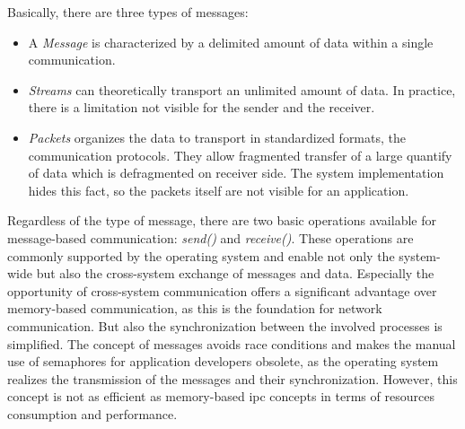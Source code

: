 Basically, there are three types of messages:
\begin{itemize}
    \item A \textit{Message} is characterized by a delimited amount of data within a single communication.
    \item \textit{Streams} can theoretically transport an unlimited amount of data. In practice, there is a limitation not visible for the sender and the receiver.
    \item \textit{Packets} organizes the data to transport in standardized formats, the communication protocols. They allow fragmented transfer of a large quantify of data which is defragmented on receiver side. The system implementation hides this fact, so the packets itself are not visible for an application\cite{glatz2015betriebssysteme}. 
\end{itemize}


Regardless of the type of message, there are two basic operations available for message-based communication: \textit{send()} and \textit{receive()}.
These operations are commonly supported by the operating system and enable not only the system-wide but also the cross-system exchange of messages and data\cite{glatz2015betriebssysteme}.
Especially the opportunity of cross-system communication offers a significant advantage over memory-based communication, as this is the foundation for network communication.
But also the synchronization between the involved processes is simplified. 
The concept of messages avoids race conditions and makes the manual use of semaphores for application developers obsolete, as the operating system realizes the transmission of the messages and their synchronization.
However, this concept is not as efficient as memory-based \ac{ipc} concepts in terms of resources consumption and performance\cite{glatz2015betriebssysteme}.


